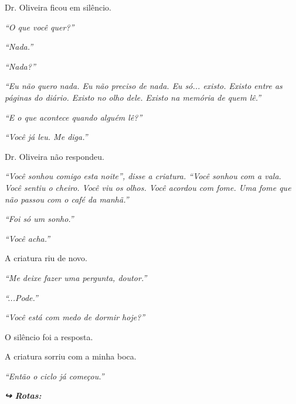 \noindent Dr. Oliveira ficou em silêncio.

\noindent \textit{\textquotedblleft{}O que você quer?\textquotedblright{}}

\noindent \textit{\textquotedblleft{}Nada.\textquotedblright{}}

\noindent \textit{\textquotedblleft{}Nada?\textquotedblright{}}

\noindent \textit{\textquotedblleft{}Eu não quero nada. Eu não preciso de nada. Eu só... existo. Existo entre as páginas do diário. Existo no olho dele. Existo na memória de quem lê.\textquotedblright{}}

\noindent \textit{\textquotedblleft{}E o que acontece quando alguém lê?\textquotedblright{}}

\noindent \textit{\textquotedblleft{}Você já leu. Me diga.\textquotedblright{}}

\noindent Dr. Oliveira não respondeu.

\noindent \textit{\textquotedblleft{}Você sonhou comigo esta noite\textquotedblright{}\textit{, disse a criatura. }\textquotedblleft{}Você sonhou com a vala. Você sentiu o cheiro. Você viu os olhos. Você acordou com fome. Uma fome que não passou com o café da manhã.\textquotedblright{}}

\noindent \textit{\textquotedblleft{}Foi só um sonho.\textquotedblright{}}

\noindent \textit{\textquotedblleft{}Você acha.\textquotedblright{}}

\noindent A criatura riu de novo.

\noindent \textit{\textquotedblleft{}Me deixe fazer uma pergunta, doutor.\textquotedblright{}}

\noindent \textit{\textquotedblleft{}...Pode.\textquotedblright{}}

\noindent \textit{\textquotedblleft{}Você está com medo de dormir hoje?\textquotedblright{}}

\noindent O silêncio foi a resposta.

\noindent A criatura sorriu com a minha boca.

\noindent \textit{\textquotedblleft{}Então o ciclo já começou.\textquotedblright{}}

\vspace{0.5em}
\noindent\textit{\textbf{↪ Rotas:}  \rotasep {} \rotasep {}}